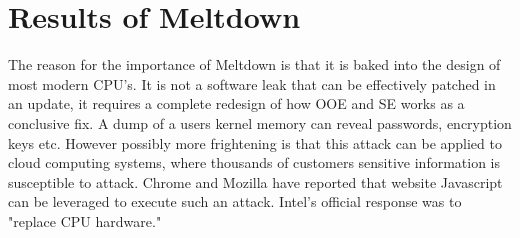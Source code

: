 \documentclass[12pt]{article}
\begin{document}
\section{Results of Meltdown}
The reason for the importance of Meltdown is that it is baked into the design of most modern CPU's.
It is not a software leak that can be effectively patched in an update, it requires a complete
redesign of how OOE and SE works as a conclusive fix. A dump of a users kernel memory can reveal
passwords, encryption keys etc. However possibly more frightening is that this attack can be applied
to cloud computing systems, where thousands of customers sensitive information is susceptible
to attack. Chrome and Mozilla have reported that website Javascript can be leveraged to execute such
an attack. Intel's official response was to "replace CPU hardware."
\printbibliography
\end{document}
